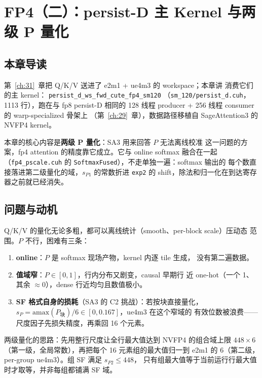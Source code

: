\chapter{FP4（二）：persist-D 主 Kernel 与两级 P 量化}\label{ch:32}

\section{本章导读}

第~\ref{ch:31}~章把 Q/K/V 送进了 e2m1 + ue4m3 的 workspace；本章讲
消费它们的主 kernel：
\texttt{persist\_d\_ws\_fwd\_}\allowbreak\texttt{cute\_fp4\_sm120}
（\texttt{sm\_120/persist\_d.cuh}，1113 行），跑在与 fp8 persist-D 相同的
128 线程 producer + 256 线程 consumer 的 warp-specialized 骨架上
（第~\ref{ch:29}~章），数据路径移植自 SageAttention3 的 NVFP4 kernel。

本章的核心内容是\textbf{两级 P 量化}：SA3 用来回答 $P$ 无法离线校准
这一问题的方案，fp4 attention 的精度靠它成立。它与 online softmax
融合在一起（\texttt{fp4\_pscale.cuh} 的
\texttt{SoftmaxFused}），不走单独一遍：softmax 输出的
每个数直接落进第二级量化的域，$s_{P1}$ 的常数折进 \texttt{exp2} 的
shift，除法和归一化在到达寄存器之前就已经消失。

\section{问题与动机}

Q/K/V 的量化无论多粗，都可以离线统计（smooth、per-block scale）压动态
范围。$P$ 不行，困难有三条：
\begin{enumerate}[itemsep=0pt,topsep=2pt]
  \item \textbf{online}：$P$ 是 softmax 现场产物，kernel 内逐 tile 生成，
        没有第二遍数据。
  \item \textbf{值域窄}：$P\in[0,1]$，行内分布又剧变，causal 早期行
        近 one-hot（一个 1、其余 $\approx0$），dense 行近均匀且数值极小。
  \item \textbf{SF 格式自身的损耗}（SA3 的 C2 挑战）：若按块直接量化，
        $s_P=\mathrm{amax}(P_{\text{块}})/6\in[0,0.167]$，ue4m3 在这个窄域的
        有效位数被浪费——尺度因子先损失精度，再乘回 16
        个元素。
\end{enumerate}

两级量化的思路：先用整行尺度让全行最大值达到 NVFP4 的组合域上限
$448\times6$（第一级，全局常数），再把每个 16 元素组的最大值归一到
e2m1 的 6（第二级，per-group ue4m3）。组 SF 满足 $s_{P2}\le448$，
只有组最大值等于当前运行行最大值时才取等，并非每组都铺满 SF 域。

